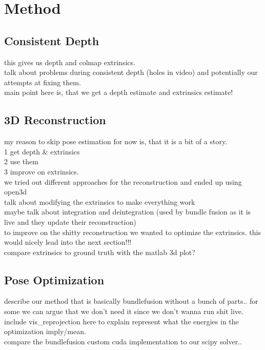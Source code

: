 \chapter{Method}
    \section{Consistent Depth}
        this gives us depth and colmap extrinsics.\\
        talk about problems during consistent depth (holes in video) and potentially our attempts at fixing them.\\
        main point here is, that we get a depth estimate and extrinsics estimate!
    \section{3D Reconstruction}
        my reason to skip pose estimation for now is, that it is a bit of a story.\\
        1 get depth \& extrinsics\\
        2 use them\\
        3 improve on extrinsics.\\
        we tried out different approaches for the reconstruction and ended up using open3d\\
        talk about modifying the extrinsics to make everything work\\
        maybe talk about integration and deintegration (used by bundle fusion as it is live and they update their reconstruction)\\
        to improve on the shitty reconstruction we wanted to optimize the extrinsics. this would nicely lead into the next section!!!\\
        compare extrinsics to ground truth with the matlab 3d plot?
    \section{Pose Optimization}
        describe our method that is basically bundlefusion without a bunch of parts.. for some we can argue that we don't need it since we don't wanna run shit live.\\
        include vis\_reprojection here to explain represent what the energies in the optimization imply/mean.\\
        compare the bundlefusion custom cuda implementation to our scipy solver..